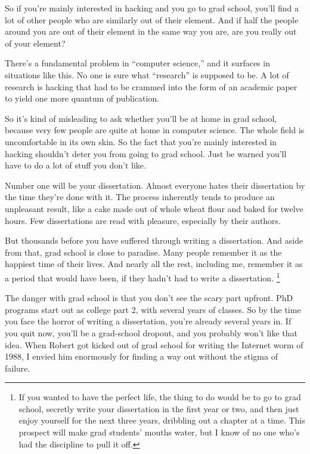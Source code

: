 \documentclass[12pt]{book}
\begin{document}
So if you're mainly interested in hacking and you go to grad school,
you'll find a lot of other people who are similarly out of their
element. And if half the people around you are out of their element in
the same way you are, are you really out of your element?

There's a fundamental problem in ``computer science,'' and it surfaces
in situations like this. No one is sure what ``research'' is supposed to
be. A lot of research is hacking that had to be crammed into the form of
an academic paper to yield one more quantum of publication.

So it's kind of misleading to ask whether you'll be at home in grad
school, because very few people are quite at home in computer science.
The whole field is uncomfortable in its own skin. So the fact that
you're mainly interested in hacking shouldn't deter you from going to
grad school. Just be warned you'll have to do a lot of stuff you don't
like.

Number one will be your dissertation. Almost everyone hates their
dissertation by the time they're done with it. The process inherently
tends to produce an unpleasant result, like a cake made out of whole
wheat flour and baked for twelve hours. Few dissertations are read with
pleasure, especially by their authors.

But thousands before you have suffered through writing a dissertation.
And aside from that, grad school is close to paradise. Many people
remember it as the happiest time of their lives. And nearly all the
rest, including me, remember it as a period that would have been, if
they hadn't had to write a dissertation. \footnote{If you wanted to have the perfect life, the thing to do would be
to go to grad school, secretly write your dissertation in the first year
or two, and then just enjoy yourself for the next three years, dribbling
out a chapter at a time. This prospect will make grad students' mouths
water, but I know of no one who's had the discipline to pull it off.}

The danger with grad school is that you don't see the scary part
upfront. PhD programs start out as college part 2, with several years of
classes. So by the time you face the horror of writing a dissertation,
you're already several years in. If you quit now, you'll be a
grad-school dropout, and you probably won't like that idea. When Robert
got kicked out of grad school for writing the Internet worm of 1988, I
envied him enormously for finding a way out without the stigma of
failure.
\end{document}

